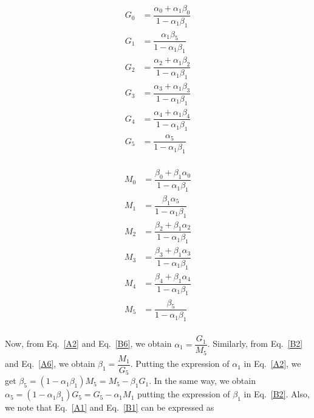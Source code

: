\documentclass[11pt, a4paper]{article}
\begin{document}
\begin{center}
    \begin{minipage}{0.49\linewidth}
    \begin{align*}
 G_{0} &= \dfrac{\alpha_{0}+\alpha_{1}\beta_{0}}{1-\alpha_{1}\beta_{1}} \label{A1}\tag{A1}    \\
 G_{1} &= \dfrac{\alpha_{1}\beta_{5}}{1-\alpha_{1}\beta_{1}}    \label{A2}\tag{A2} \\
 G_{2} &= \dfrac{\alpha_{2}+\alpha_{1}\beta_{2}}{1-\alpha_{1}\beta_{1}}    \label{A3}\tag{A3} \\
 G_{3} &= \dfrac{\alpha_{3}+\alpha_{1}\beta_{3}}{1-\alpha_{1}\beta_{1}}    \label{A4}\tag{A4} \\
 G_{4} &= \dfrac{\alpha_{4}+\alpha_{1}\beta_{4}}{1-\alpha_{1}\beta_{1}}    \label{A5}\tag{A5} \\
 G_{5} &= \dfrac{\alpha_{5}}{1-\alpha_{1}\beta_{1}}    \label{A6}\tag{A6} \\
 \end{align*}
\end{minipage}
\begin{minipage}{0.49\linewidth}
    \begin{align*}
 M_{0} &= \dfrac{\beta_{0}+\beta_{1}\alpha_{0}}{1-\alpha_{1}\beta_{1}} \label{B1}\tag{B1}    \\
 M_{1} &= \dfrac{\beta_{1}\alpha_{5}}{1-\alpha_{1}\beta_{1}}      \label{B2}\tag{B2} \\
 M_{2} &= \dfrac{\beta_{2}+\beta_{1}\alpha_{2}}{1-\alpha_{1}\beta_{1}}   \label{B3}\tag{B3} \\
 M_{3} &= \dfrac{\beta_{3}+\beta_{1}\alpha_{3}}{1-\alpha_{1}\beta_{1}}   \label{B4}\tag{B4} \\
 M_{4} &= \dfrac{\beta_{4}+\beta_{1}\alpha_{4}}{1-\alpha_{1}\beta_{1}}   \label{B5}\tag{B5} \\
 M_{5} &= \dfrac{\beta_{5}}{1-\alpha_{1}\beta_{1}}    \label{B6}\tag{B6} \\
 \end{align*}
\end{minipage}
\end{center}

\noindent Now, from Eq.~\eqref{A2} and Eq.~\eqref{B6}, we obtain $\alpha_{1}=\dfrac{G_{1}}{M_{5}}$. Similarly, from Eq.~\eqref{B2} and Eq.~\eqref{A6}, we obtain $\beta_{1}=\dfrac{M_{1}}{G_{5}}$. Putting the expression of $\alpha_{1}$ in Eq.~\eqref{A2}, we get $\beta_{5}=(1-\alpha_{1}\beta_{1})M_{5}=M_{5}-\beta_{1}G_{1}$. In the same way, we obtain $\alpha_{5}=(1-\alpha_{1}\beta_{1})G_{5}=G_{5}-\alpha_{1}M_{1}$ putting the expression of $\beta_{1}$ in Eq.~\eqref{B2}. Also, we note that Eq.~\eqref{A1} and Eq.~\eqref{B1} can be expressed as
\end{document}
